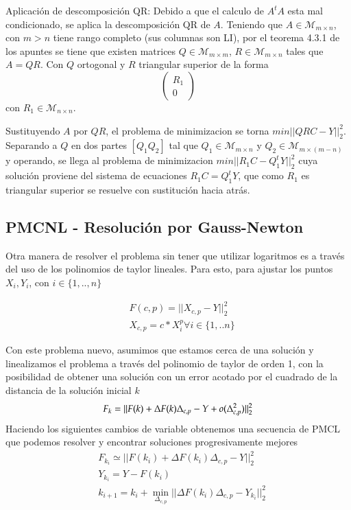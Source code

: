 \documentclass{endm}
\begin{document}
Aplicación de descomposición QR:
Debido a que el calculo de $A^tA$ esta mal condicionado, se aplica la descomposición QR de $A$.
Teniendo que $A \in \mathcal{M}_{m \times n}$, con $m > n$ tiene rango completo (sus columnas son LI),
por el teorema 4.3.1 de los apuntes se tiene que existen matrices $Q \in \mathcal{M}_{m \times m}$,
$R \in \mathcal{M}_{m \times n}$ tales que $A = QR$. Con $Q$ ortogonal
y $R$ triangular superior de la forma  \begin{equation*} \begin{pmatrix} R_1 \\ 0 \end{pmatrix}\end{equation*} con $R_1 \in \mathcal{M}_{n \times n}$.

Sustituyendo $A$ por $QR$, el problema de minimizacion se torna $min ||QRC - Y||^2_2$.
Separando a $Q$ en dos partes $[Q_1 Q_2]$ tal que $Q_1 \in \mathcal{M}_{m \times n}$ y
$Q_2 \in \mathcal{M}_{m \times (m-n)}$ y operando, se llega al problema de minimizacion $min ||R_1C - Q_1^tY||^2_2$
cuya solución proviene del sistema de ecuaciones $R_1C = Q_1^tY$, que como $R_1$ es triangular superior se resuelve con
sustitución hacia atrás.


\subsection{PMCNL - Resolución por Gauss-Newton}
Otra manera de resolver el problema sin tener que utilizar logaritmos es a través del uso de los polinomios de taylor lineales. Para esto, para ajustar los puntos $X_i,Y_i$, con $ i \in \{1,..,n\}$

\begin{align*}
&F(c,p) =||X_{c,p} - Y||^2_2 \\
&X_{c,p} = c*X_i^p \forall i \in \{1,..n\}
\end{align*}

Con este problema nuevo, asumimos que estamos cerca de una solución y linealizamos el problema a través del polinomio de taylor de orden 1, con la posibilidad de obtener una solución con un error acotado por el cuadrado de la distancia de la solución inicial $k$
\begin{equation*}
F_k = ||  F(k) + \Delta F(k)\Delta_{c,p} - Y + o(\Delta_{c,p}^2)||^2_2\\
\end{equation*}
Haciendo los siguientes cambios de variable obtenemos una secuencia de PMCL que podemos resolver y encontrar soluciones progresivamente mejores
\begin{align*}
&F_{k_i} \simeq || F(k_i) + \Delta F(k_i)\Delta_{c,p} - Y||^2_2\\
&Y_{k_i} = Y - F(k_i) \\
&k_{i+1} = k_i + \min_{\Delta_{c,p}} || \Delta F(k_i)\Delta_{c,p} - Y_{k_i} ||^2_2
\end{align*}
\end{document}
